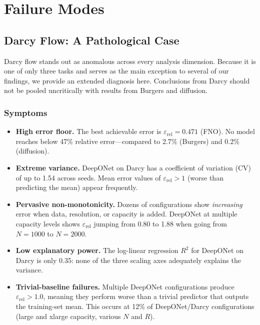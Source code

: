 \documentclass[11pt]{article}
\newcommand{\relLtwo}{\varepsilon_{\mathrm{rel}}}
\begin{document}
\section{Failure Modes}
\label{sec:failures}

\subsection{Darcy Flow: A Pathological Case}
\label{sec:darcy}

Darcy flow stands out as anomalous across every analysis dimension.
Because it is one of only three tasks and serves as the main
exception to several of our findings, we provide an extended
diagnosis here. Conclusions from Darcy should not be pooled
uncritically with results from Burgers and diffusion.

\subsubsection{Symptoms}

\begin{itemize}[leftmargin=*,itemsep=2pt]
  \item \textbf{High error floor.} The best achievable error is
    $\relLtwo = 0.471$ (FNO). No model reaches below 47\% relative
    error---compared to 2.7\% (Burgers) and 0.2\% (diffusion).

  \item \textbf{Extreme variance.} DeepONet on Darcy has a
    coefficient of variation (CV) of up to 1.54 across seeds. Mean
    error values of $\relLtwo > 1$ (worse than predicting the mean)
    appear frequently.

  \item \textbf{Pervasive non-monotonicity.} Dozens of configurations
    show \emph{increasing} error when data, resolution, or capacity
    is added. DeepONet at multiple capacity levels shows
    $\relLtwo$ jumping from 0.80 to 1.88 when going from $N = 1000$
    to $N = 2000$.

  \item \textbf{Low explanatory power.} The log-linear regression
    $R^2$ for DeepONet on Darcy is only 0.35: none of the three
    scaling axes adequately explains the variance.

  \item \textbf{Trivial-baseline failures.} Multiple DeepONet
    configurations produce $\relLtwo > 1.0$, meaning they perform
    worse than a trivial predictor that outputs the training-set
    mean. This occurs at 12\% of DeepONet/Darcy configurations
    (large and xlarge capacity, various $N$ and $R$).
\end{itemize}
\end{document}
